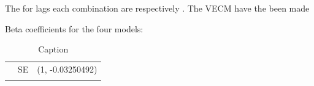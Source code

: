 The for lags each combination are respectively . The VECM have the been made



Beta coefficients for the four models:
\begin{table}[]
    \centering
    \begin{tabular}{c|c|c}
       & SE & (1, -0.03250492) \\
       &  & 
    \end{tabular}
    \caption{Caption}
    \label{tab:my_label}
\end{table}









